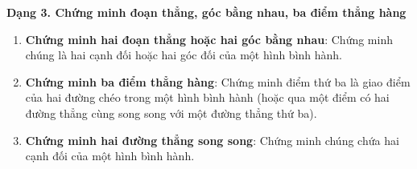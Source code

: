\textbf{Dạng 3. Chứng minh đoạn thẳng, góc bằng nhau, ba điểm thẳng hàng}
\begin{enumerate}
\item \textbf{Chứng minh hai đoạn thẳng hoặc hai góc bằng nhau}: Chứng minh chúng là hai cạnh đối hoặc hai góc đối của một hình bình hành.
\item \textbf{Chứng minh ba điểm thẳng hàng}: Chứng minh điểm thứ ba là giao điểm của hai đường chéo trong một hình bình hành (hoặc qua một điểm có hai đường thẳng cùng song song với một đường thẳng thứ ba).
\item \textbf{Chứng minh hai đường thẳng song song}: Chứng minh chúng chứa hai cạnh đối của một hình bình hành.
\end{enumerate}
